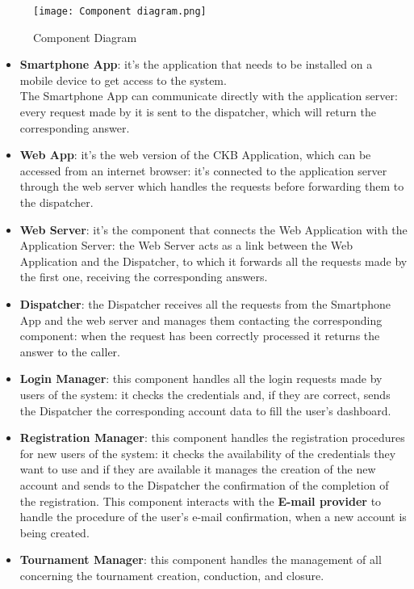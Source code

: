 \documentclass{article}
\begin{document}
\begin{figure}[H]
    \centering
    \texttt{[image: Component diagram.png]}
    \caption{Component Diagram}
\end{figure}
\begin{itemize}
    \item \textbf{Smartphone App}: it's the application that needs to be installed on a mobile device to 
    get access to the system.\\
    The Smartphone App can communicate directly with the application server: every request made by it is sent to the dispatcher, which will return the corresponding answer.
    \item \textbf{Web App}: it's the web version of the CKB Application, which can be accessed from an internet browser: it's connected to the application server through the web server which handles the requests before forwarding them to the dispatcher.
    \item \textbf{Web Server}: it's the component that connects the Web Application with the Application Server: the Web Server acts as a link between the Web Application and the Dispatcher, to which it forwards all the requests made by the first one, receiving the corresponding answers. 
    \item \textbf{Dispatcher}: the Dispatcher receives all the requests from the Smartphone App and the web server and manages them contacting the corresponding component: when the request has been correctly processed it returns the answer to the caller.
    \item \textbf{Login Manager}: this component handles all the login requests made by users of the system: it checks the credentials and, if they are correct, sends the Dispatcher the corresponding account data to fill the user's dashboard.
    \item \textbf{Registration Manager}: this component handles the registration procedures for new users of the system: it checks the availability of the credentials they want to use and if they are available it manages the creation of the new account and sends to the Dispatcher the confirmation of the completion of the registration.
    This component interacts with the \textbf{E-mail provider} to handle the procedure of the user's e-mail confirmation, when a new account is being created.
    \item \textbf{Tournament Manager}: this component handles the management of all concerning the tournament creation, conduction, and closure.\\

\end{itemize}
\end{document}
